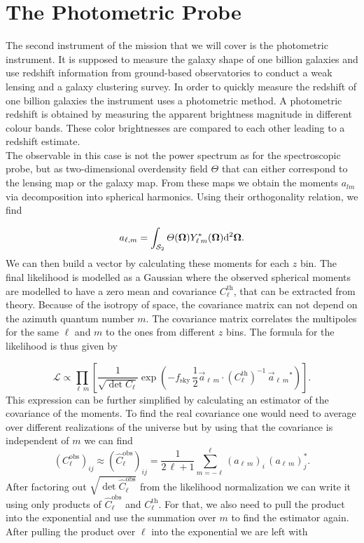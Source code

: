 \documentclass[../main.tex]{subfiles}
\begin{document}
\chapter{The Photometric Probe}
The second instrument of the \Euclid mission that we will cover is the photometric instrument. It is supposed to measure the galaxy shape of one billion galaxies and use redshift information from ground-based observatories to conduct a weak lensing and a galaxy clustering survey. In order to quickly measure the redshift of one billion galaxies the instrument uses a photometric method. A photometric redshift is obtained by measuring the apparent brightness magnitude in different colour bands. These color brightnesses are compared to each other leading to a redshift estimate.\\
The observable in this case is not the power spectrum as for the spectroscopic probe, but as two-dimensional overdensity field $\varTheta$ that can either correspond to the lensing map or the galaxy map. From these maps we obtain the moments $a_{lm}$ via decomposition into spherical harmonics. Using their orthogonality relation, we find 

\begin{equation}
    a_{\ell, m} = \int_{\mathcal{S}_2} \varTheta(\boldsymbol{\Omega}) Y_{\ell\,m}^*(\boldsymbol{\Omega}) \mathrm{d}^2 \boldsymbol{\boldsymbol{\Omega}}.
\end{equation}
We can then build a vector by calculating these moments for each $z$ bin. The final likelihood is modelled as a Gaussian where the observed spherical moments are modelled to have a zero mean and covariance $C^\mathrm{th}_\ell$, that can be extracted from theory. Because of the isotropy of space, the covariance matrix can not depend on the azimuth quantum number $m$. The covariance matrix correlates the multipoles for the same $\ell$ and $m$ to the ones from different $z$ bins. The formula for the likelihood is thus given by 

\begin{equation}
    \mathcal{L} \propto \prod_{\ell\,m} \left[\frac{1}{\sqrt{\det C_\ell}} \exp\left(-f_\mathrm{sky}\, \frac{1}{2}\vec{a}_{\ell\,m} \cdot \left(C_\ell^\mathrm{th}\right)^{-1}\,\vec{a}_{\ell\,m}^{}\!^*\right) \right].
\end{equation}
This expression can be further simplified by calculating an estimator of the covariance of the moments. To find the real covariance one would need to average over different realizations of the universe but by using that the covariance is independent of $m$ we can find \begin{equation}
    \left(C^\mathrm{obs}_\ell\right)_{ij} \approx  \left(\hat{C}^\mathrm{obs}_\ell\right)_{ij} = \frac{1}{2\,\ell+1} \sum_{m=-\ell}^{\ell} \left(a_{\ell\,m}\right)_i \, \left(a_{\ell\,m}\right)_j^*.
\end{equation}
After factoring out $\sqrt{\det \hat{C}^\mathrm{obs}_\ell}$ from the likelihood normalization we can write it using only products of $\hat{C}_\ell^\mathrm{obs}$ and $C_\ell^\mathrm{th}$. For that, we also need to pull the product into the exponential and use the summation over $m$ to find the estimator again. After pulling the product over $\ell$ into the exponential we are left with 
\end{document}
